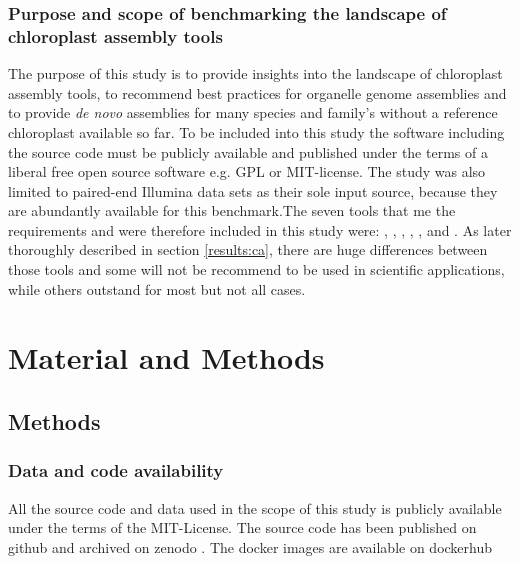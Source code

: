 \subsubsection{Purpose and scope of benchmarking the landscape of chloroplast assembly tools}

The purpose of this study is to provide insights into the landscape of chloroplast assembly tools, to
recommend best practices for organelle genome assemblies and to provide \textit{de novo} assemblies for many
species and family's without a reference chloroplast available so far.  To be included into this study the
software including the source code must be publicly available and published under the terms of a liberal free
open source software e.g. GPL or MIT-license. The study was also limited to paired-end Illumina data sets as
their sole input source, because they are abundantly available for this benchmark.The seven tools that me the
requirements and were therefore included in this study were: \ce, \oa, \fp, \ioga, \np, \go and \cassp. As
later thoroughly described in section \ref{results:ca}, there are huge differences between those tools and
some will not be recommend to be used in scientific applications, while others outstand for most but not all
cases.


\section{Material and Methods}
\subsection{Methods}
\subsubsection{Data and code availability}
All the source code and data used in the scope of this study is publicly available under the terms of the MIT-License. The source code has been published on github \cite{github-benchmark-repo} and archived on zenodo \cite{zenodorepo} . The docker images are available on dockerhub \cite{dockerhub-benchmark}

